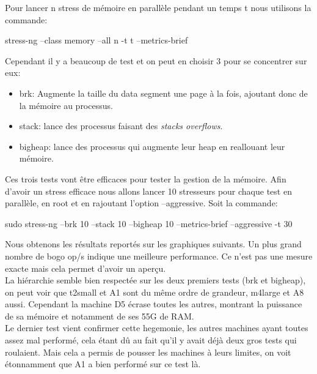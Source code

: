 \documentclass[11pt]{article}
\begin{document}
	Pour lancer n stress de mémoire en parallèle pendant un temps t nous 
	utilisons la commande:
	\begin{center}
		stress-ng --class memory --all n -t t --metrics-brief
	\end{center}
	Cependant il y a beaucoup de test et on peut en choisir 3 pour se concentrer
	sur eux:
	\begin{itemize}
		\item brk: Augmente la taille du data segment une page à la fois,
			ajoutant donc de la mémoire au processus.
		\item stack: lance des processus faisant des \textit{stacks overflows}.
		\item bigheap: lance des processus qui augmente leur heap en
			reallouant leur mémoire.
	\end{itemize}
	Ces trois tests vont être efficaces pour tester la gestion de la mémoire.
	Afin d'avoir un stress efficace nous allons lancer 10 stresseurs pour
	chaque test en parallèle, en root et en rajoutant l'option --aggressive.
	Soit la commande:
	\begin{center}
		sudo stress-ng --brk 10 --stack 10 --bigheap 10 --metrics-brief --aggressive -t 30
	\end{center}

	Nous obtenons les résultats reportés sur les graphiques suivants. Un
	plus grand nombre de bogo op/s indique une meilleure performance. Ce n'est pas
	une mesure exacte mais cela permet d'avoir un aperçu.\\
	La hiérarchie semble bien respectée sur les deux premiers tests (brk et bigheap),
	on peut voir que t2small et A1 sont du même ordre de grandeur, m4large et A8 aussi.
	Cependant la machine D5 écrase toutes les autres, montrant la puissance de sa mémoire
	et notamment de ses 55G de RAM. \\
	Le dernier test vient confirmer cette hegemonie, les autres machines ayant toutes assez 
	mal performé, cela étant dû au fait qu'il y avait déjà deux gros tests qui roulaient.
	Mais cela a permis de pousser les machines à leurs limites, on voit étonnamment que A1
	a bien performé sur ce test là.
\end{document}
